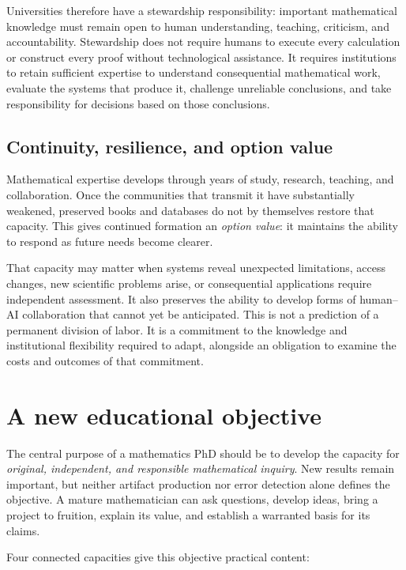 \documentclass[11pt]{article}
\newcommand{\term}[1]{\emph{#1}}
\begin{document}
Universities therefore have a stewardship responsibility: important mathematical
knowledge must remain open to human understanding, teaching, criticism, and
accountability.  Stewardship does not require humans to execute every calculation or
construct every proof without technological assistance.  It requires institutions to
retain sufficient expertise to understand consequential mathematical work, evaluate the
systems that produce it, challenge unreliable conclusions, and take responsibility for
decisions based on those conclusions.

\subsection{Continuity, resilience, and option value}

Mathematical expertise develops through years of study, research, teaching, and
collaboration. Once the communities that transmit it have substantially weakened,
preserved books and databases do not by themselves restore that capacity. This gives
continued formation an \term{option value}: it maintains the ability to respond as
future needs become clearer.

That capacity may matter when systems reveal unexpected limitations, access changes,
new scientific problems arise, or consequential applications require independent
assessment. It also preserves the ability to develop forms of human--AI collaboration
that cannot yet be anticipated. This is not a prediction of a permanent division of
labor. It is a commitment to the knowledge and institutional flexibility required to
adapt, alongside an obligation to examine the costs and outcomes of that commitment.

\section{A new educational objective}
\label{sec:capacities}

The central purpose of a mathematics PhD should be to develop the capacity for
\emph{original, independent, and responsible mathematical inquiry}. New results remain
important, but neither artifact production nor error detection alone defines the
objective. A mature mathematician can ask questions, develop ideas, bring a project to
fruition, explain its value, and establish a warranted basis for its claims.

Four connected capacities give this objective practical content:
\end{document}
